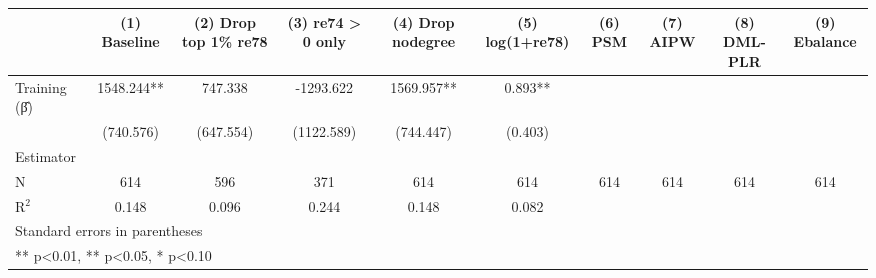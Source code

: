 \begin{table}[htbp]
\centering
\begin{tabular}{lccccccccc}
\hline\hline
 & (1) Baseline & (2) Drop top 1\% re78 & (3) re74 > 0 only & (4) Drop nodegree & (5) log(1+re78) & (6) PSM & (7) AIPW & (8) DML-PLR & (9) Ebalance \\
\hline
Training (β̂) & 1548.244** & 747.338 & -1293.622 & 1569.957** & 0.893** &  &  &  &  \\
 & (740.576) & (647.554) & (1122.589) & (744.447) & (0.403) &  &  &  &  \\
\hline
Estimator &  &  &  &  &  &  &  &  &  \\
N & 614 & 596 & 371 & 614 & 614 & 614 & 614 & 614 & 614 \\
R$^2$ & 0.148 & 0.096 & 0.244 & 0.148 & 0.082 &  &  &  &  \\
\hline\hline
\multicolumn{10}{l}{\footnotesize Standard errors in parentheses} \\
\multicolumn{10}{l}{\footnotesize *** p<0.01, ** p<0.05, * p<0.10} \\
\end{tabular}
\end{table}